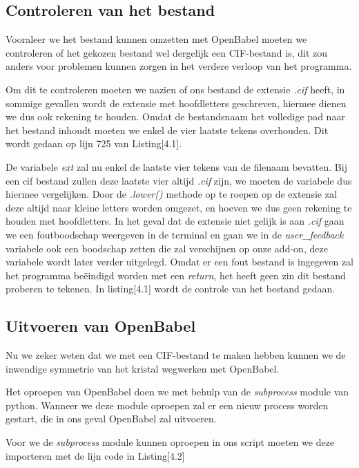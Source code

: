 \subsection{Controleren van het bestand}
Vooraleer we het bestand kunnen omzetten met OpenBabel moeten we controleren of het gekozen bestand wel dergelijk een CIF-bestand is, dit zou anders voor problemen kunnen zorgen in het verdere verloop van het programma.
\par
Om dit te controleren moeten we nazien of ons bestand de extensie \textit{.cif} heeft, in sommige gevallen wordt de extensie met hoofdletters geschreven, hiermee dienen we dus ook rekening te houden. Omdat de bestandsnaam het volledige pad naar het bestand inhoudt moeten we enkel de vier laatste tekens overhouden. Dit wordt gedaan op lijn 725 van Listing[4.1].
\par 
De variabele \textit{ext} zal nu enkel de laatste vier tekens van de filenaam bevatten. Bij een cif bestand zullen deze laatste vier altijd \textit{.cif} zijn, we moeten de variabele dus hiermee vergelijken. Door de \textit{.lower()} methode op te roepen op de extensie zal deze altijd naar kleine letters worden omgezet, en hoeven we dus geen rekening te houden met hoofdletters. In het geval dat de extensie niet gelijk is aan \textit{.cif} gaan we een foutboodschap weergeven in de terminal en gaan we in de \textit{user\_feedback} variabele ook een boodschap zetten die zal verschijnen op onze add-on, deze variabele wordt later verder uitgelegd. Omdat er een fout bestand is ingegeven zal het programma beëindigd worden met een \textit{return}, het heeft geen zin dit bestand proberen te tekenen. In listing[4.1] wordt de controle van het bestand gedaan.



\subsection{Uitvoeren van OpenBabel}
Nu we zeker weten dat we met een CIF-bestand te maken hebben kunnen we de inwendige symmetrie van het kristal wegwerken met OpenBabel. 
\par
Het oproepen van OpenBabel doen we met behulp van de \textit{subprocess} module van python. Wanneer we deze module oproepen zal er een nieuw process worden gestart, die in ons geval OpenBabel zal uitvoeren.
\par
Voor we de \textit{subprocess} module kunnen oproepen in ons script moeten we  deze importeren met de lijn code in Listing[4.2]

